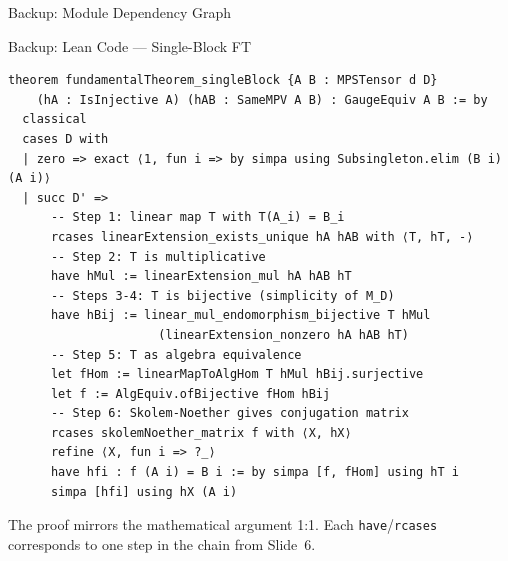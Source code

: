 \documentclass[aspectratio=169,10pt]{beamer}
\begin{document}
\begin{frame}{Backup: Module Dependency Graph}
\begin{center}
    \end{center}
\end{frame}

\begin{frame}[fragile]{Backup: Lean Code --- Single-Block FT}
    \vspace{-0.6em}
    \begin{lstlisting}
theorem fundamentalTheorem_singleBlock {A B : MPSTensor d D}
    (hA : IsInjective A) (hAB : SameMPV A B) : GaugeEquiv A B := by
  classical
  cases D with
  | zero => exact ⟨1, fun i => by simpa using Subsingleton.elim (B i) (A i)⟩
  | succ D' =>
      -- Step 1: linear map T with T(A_i) = B_i
      rcases linearExtension_exists_unique hA hAB with ⟨T, hT, -⟩
      -- Step 2: T is multiplicative
      have hMul := linearExtension_mul hA hAB hT
      -- Steps 3-4: T is bijective (simplicity of M_D)
      have hBij := linear_mul_endomorphism_bijective T hMul
                     (linearExtension_nonzero hA hAB hT)
      -- Step 5: T as algebra equivalence
      let fHom := linearMapToAlgHom T hMul hBij.surjective
      let f := AlgEquiv.ofBijective fHom hBij
      -- Step 6: Skolem-Noether gives conjugation matrix
      rcases skolemNoether_matrix f with ⟨X, hX⟩
      refine ⟨X, fun i => ?_⟩
      have hfi : f (A i) = B i := by simpa [f, fHom] using hT i
      simpa [hfi] using hX (A i)
\end{lstlisting}

    \vspace{-0.2em}
    {\scriptsize The proof mirrors the mathematical argument 1:1.
        Each \texttt{have}/\texttt{rcases} corresponds to one step in the chain from Slide~6.}
\end{frame}
\end{document}
